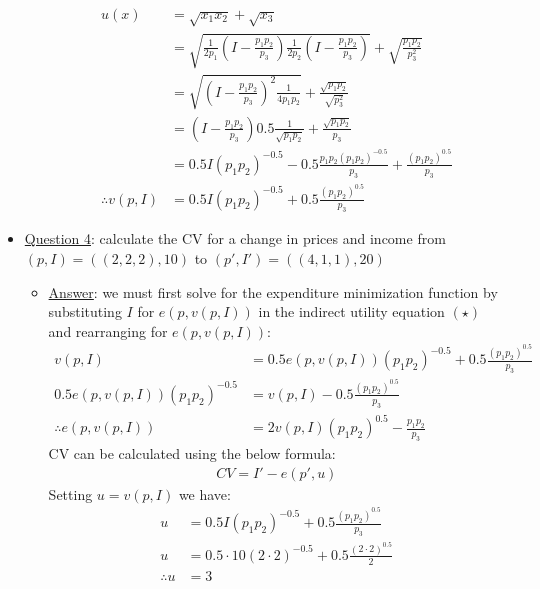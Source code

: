 \documentclass{article}
\begin{document}
\begin{itemize}
\begin{itemize}
    \begin{align*}
      u(x) &= \sqrt{x_{1}x_{2}} + \sqrt{x_{3}} \\
      &= \sqrt{\frac{1}{2p_{1}}(I - \frac{p_{1}p_{2}}{p_{3}})\frac{1}{2p_{2}}(I - \frac{p_{1}p_{2}}{p_{3}})} + \sqrt{\frac{p_{1}p_{2}}{p_{3}^{2}}} \\
      &= \sqrt{(I - \frac{p_{1}p_{2}}{p_{3}})^{2}\frac{1}{4p_{1}p_{2}}} + \frac{\sqrt{p_{1}p_{2}}}{\sqrt{p_{3}^{2}}} \\
      &= (I - \frac{p_{1}p_{2}}{p_{3}})0.5 \frac{1}{\sqrt{p_{1}p_{2}}} + \frac{\sqrt{p_{1}p_{2}}}{p_{3}} \\
      &= 0.5I(p_{1}p_{2})^{-0.5} - 0.5 \frac{p_{1}p_{2}(p_{1}p_{2})^{-0.5}}{p_{3}} + \frac{(p_{1}p_{2})^{0.5}}{p_{3}} \\
      \therefore v(p,I) &= 0.5 I(p_{1}p_{2})^{-0.5} + 0.5 \frac{(p_{1}p_{2})^{0.5}}{p_{3}} \ \tag{$\star$}
    \end{align*}
  \end{itemize}
  \item  \underline{Question 4}: calculate the CV for a change in prices and income from $(p,I) = ((2,2,2), 10)$ to $(p',I') = ((4,1,1),20)$
  \begin{itemize}
    \item  \underline{Answer}: we must first solve for the expenditure minimization function by substituting $I$ for $e(p,v(p,I))$ in the indirect utility equation $(\star)$ and rearranging for $e(p,v(p,I))$:
    \begin{align*}
      v(p,I) &= 0.5 e(p,v(p,I))(p_{1}p_{2})^{-0.5} + 0.5 \frac{(p_{1}p_{2})^{0.5}}{p_{3}} \\
      0.5 e(p,v(p,I))(p_{1}p_{2})^{-0.5} &= v(p,I) - 0.5 \frac{(p_{1}p_{2})^{0.5}}{p_{3}} \\
      \therefore e(p,v(p,I)) &= 2v(p,I)(p_{1}p_{2})^{0.5} - \frac{p_{1}p_{2}}{p_{3}} \ \tag{$\star$}
    \end{align*}
    CV can be calculated using the below formula:
    \begin{gather*}
      CV = I' - e(p', u)
    \end{gather*}
    Setting $u = v(p,I)$ we have:
    \begin{align*}
      u &= 0.5 I(p_{1}p_{2})^{-0.5} + 0.5 \frac{(p_{1}p_{2})^{0.5}}{p_{3}} \\
      u &= 0.5 \cdot 10 (2 \cdot 2)^{-0.5} + 0.5 \frac{(2 \cdot 2)^{0.5}}{2} \\
      \therefore u &= 3
    \end{align*}

\end{itemize}
\end{itemize}
\end{document}
